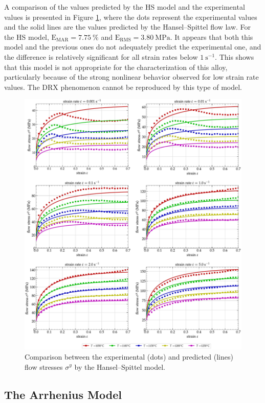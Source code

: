 \documentclass[metals,article,accept,pdftex,moreauthors]{Definitions/mdpi}
\DeclareRobustCommand{\RMSE}{\text{E}_\text{RMS}}
\DeclareRobustCommand{\MARE}{\text{E}_\text{MAR}}
\DeclareRobustCommand{\ps}{\text{s}^{-1}}
\DeclareRobustCommand{\MPa}{\text{MPa}}
\begin{document}
A comparison of the values predicted by the HS model and the experimental values is presented in Figure \ref{fig:CompExp-HS-6}, where the dots represent the experimental values and the solid lines are the values predicted by the Hansel--Spittel flow law.
For the HS model, $\MARE=7.75~\%$ and $\RMSE=3.80~\MPa$.
It appears that both this model and the previous ones do not adequately predict the experimental one, and the difference is relatively significant for all strain rates below $1~\ps$.
This shows that this model is not appropriate for the characterization of this alloy, particularly because of the strong nonlinear behavior observed for low strain rate values.
The DRX phenomenon cannot be reproduced by this type of model.

\begin{figure}[H]

\includegraphics[width=0.9\columnwidth]
{Figures/CompExp-HS-6}
\caption{Comparison between the experimental (dots) and predicted (lines) flow stresses $\sigma^y$ by the Hansel--Spittel model.}
\label{fig:CompExp-HS-6}
\end{figure}

\subsection{The Arrhenius Model\label{sec:ARmodel}}
\end{document}
